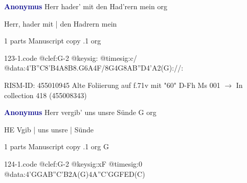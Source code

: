\documentclass[twocolumn]{book}
\begin{document}
\newline \par \vspace{7pt} \textcolor{darkblue}{\textbf{Anonymus  }}
\newline Herr hader' mit den Had'rern mein    
\newline org
\newline \begin{itshape}[f.71v, at left:] Herr, hader mit | den Hadrern mein\end{itshape} 
\newline \textcolor{darkblue}{}  1 parts  
\newline Manuscript copy
.1  org  
\begin{filecontents*}{123-1.code}
@clef:G-2
@keysig:
@timesig:c/
@data:4'B''C8'B4A8B8.G6A4F/8G4G8A{B''D}4'A2(G)://:
\end{filecontents*}
\newline
%

\newline RISM-ID: 455010945
\newline Alte Foliierung auf f.71v mit "60"
\newline D-Fh  Ms 001
\newline $\rightarrow$ In collection 418 (455008343)

\newline \par \vspace{7pt} \textcolor{darkblue}{\textbf{Anonymus  }}
\newline Herr vergib' uns unsre Sünde  G  
\newline org
\newline \begin{itshape}[f.13v, at left:] HE Vgib | uns unsre | Sünde\end{itshape} 
\newline \textcolor{darkblue}{}  1 parts  
\newline Manuscript copy
.1  org  G  
\begin{filecontents*}{124-1.code}
@clef:G-2
@keysig:xF
@timesig:0
@data:4'GGAB''C'B2A(G)4A''C'GGFED(C)
\end{filecontents*}
\newline
%
\end{document}

